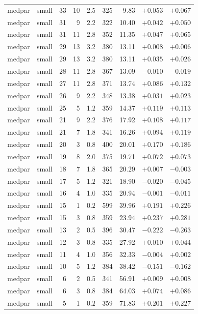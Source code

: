 \begin{longtable}{@{}llrrrrrrr@{}}
medpar & small & 33 & 10 & 2.5 & 325 & 9.83 & $+0.053$ & $+0.067$\\
medpar & small & 31 & 9 & 2.2 & 322 & 10.40 & $+0.042$ & $+0.050$\\
medpar & small & 31 & 11 & 2.8 & 352 & 11.35 & $+0.047$ & $+0.065$\\
medpar & small & 29 & 13 & 3.2 & 380 & 13.11 & $+0.008$ & $+0.006$\\
medpar & small & 29 & 13 & 3.2 & 380 & 13.11 & $+0.035$ & $+0.026$\\
medpar & small & 28 & 11 & 2.8 & 367 & 13.09 & $-0.010$ & $-0.019$\\
medpar & small & 27 & 11 & 2.8 & 371 & 13.74 & $+0.086$ & $+0.132$\\
medpar & small & 26 & 9 & 2.2 & 348 & 13.38 & $+0.031$ & $+0.023$\\
medpar & small & 25 & 5 & 1.2 & 359 & 14.37 & $+0.119$ & $+0.113$\\
medpar & small & 21 & 9 & 2.2 & 376 & 17.92 & $+0.108$ & $+0.117$\\
medpar & small & 21 & 7 & 1.8 & 341 & 16.26 & $+0.094$ & $+0.119$\\
medpar & small & 20 & 3 & 0.8 & 400 & 20.01 & $+0.170$ & $+0.186$\\
medpar & small & 19 & 8 & 2.0 & 375 & 19.71 & $+0.072$ & $+0.073$\\
medpar & small & 18 & 7 & 1.8 & 365 & 20.29 & $+0.007$ & $-0.003$\\
medpar & small & 17 & 5 & 1.2 & 321 & 18.90 & $-0.020$ & $-0.045$\\
medpar & small & 16 & 4 & 1.0 & 335 & 20.94 & $-0.001$ & $-0.011$\\
medpar & small & 15 & 1 & 0.2 & 599 & 39.96 & $+0.191$ & $+0.226$\\
medpar & small & 15 & 3 & 0.8 & 359 & 23.94 & $+0.237$ & $+0.281$\\
medpar & small & 13 & 2 & 0.5 & 396 & 30.47 & $-0.222$ & $-0.263$\\
medpar & small & 12 & 3 & 0.8 & 335 & 27.92 & $+0.010$ & $+0.044$\\
medpar & small & 11 & 4 & 1.0 & 356 & 32.33 & $-0.004$ & $+0.002$\\
medpar & small & 10 & 5 & 1.2 & 384 & 38.42 & $-0.151$ & $-0.162$\\
medpar & small & 6 & 2 & 0.5 & 341 & 56.91 & $+0.009$ & $+0.008$\\
medpar & small & 6 & 3 & 0.8 & 384 & 64.03 & $+0.074$ & $+0.086$\\
medpar & small & 5 & 1 & 0.2 & 359 & 71.83 & $+0.201$ & $+0.227$\\

\end{longtable}
